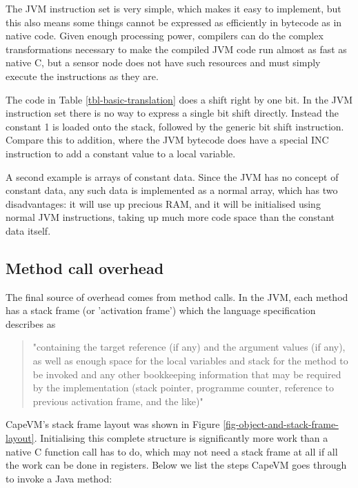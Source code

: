 The JVM instruction set is very simple, which makes it easy to implement, but this also means some things cannot be expressed as efficiently in bytecode as in native code. Given enough processing power, compilers can do the complex transformations necessary to make the compiled JVM code run almost as fast as native C, but a sensor node does not have such resources and must simply execute the instructions as they are.

The code in Table \ref{tbl-basic-translation} does a shift right by one bit. In the JVM instruction set there is no way to express a single bit shift directly. Instead the constant 1 is loaded onto the stack, followed by the generic bit shift instruction. Compare this to addition, where the JVM bytecode does have a special INC instruction to add a constant value to a local variable.

A second example is arrays of constant data. Since the JVM has no concept of constant data, any such data is implemented as a normal array, which has two disadvantages: it will use up precious RAM, and it will be initialised using normal JVM instructions, taking up much more code space than the constant data itself.

\subsection{Method call overhead}
\label{sec-overhead-method-call}
The final source of overhead comes from method calls. In the JVM, each method has a stack frame (or 'activation frame') which the language specification describes as
\begin{quotation}
"containing the target reference (if any) and the argument values (if any), as well as enough space for the local variables and stack for the method to be invoked and any other bookkeeping information that may be required by the implementation (stack pointer, programme counter, reference to previous activation frame, and the like)" \cite{Gosling:2014}
\end{quotation}

CapeVM's stack frame layout was shown in Figure \ref{fig-object-and-stack-frame-layout}. Initialising this complete structure is significantly more work than a native C function call has to do, which may not need a stack frame at all if all the work can be done in registers. Below we list the steps CapeVM goes through to invoke a Java method:

